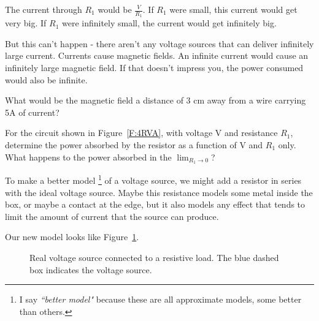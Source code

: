 The current through $R_1$ would be $\frac{V}{R_1}$. If $R_1$ were small, this current would get very big. If $R_1$ were infinitely small, the current would get infinitely big. \par
But this can't happen - there aren't any voltage sources that can deliver infinitely large current. Currents cause magnetic fields. An infinite current would cause an infinitely large magnetic field. If that doesn't impress you, the power consumed would also be infinite.

\begin{blevel}
What would be the magnetic field a distance of 3 cm away from a wire carrying 5A of current?
\end{blevel}

\begin{clevel}
For the circuit shown in Figure~\ref{F:4RVA}, with voltage V and resistance $R_1$, determine the power absorbed by the resistor as a function of V and $R_1$ only. What happens to the power absorbed in the $\lim_{R_1 \to 0}$? 
\end{clevel}

To make a better model \footnote{I say \emph{``better model"} because these are all approximate models, some better than others.} of a voltage source, we might add a resistor in series with the ideal voltage source. Maybe this resistance models some metal inside the box, or maybe a contact at the edge, but it also models any effect that tends to limit the amount of current that the source can produce.
\par
Our new model looks like Figure~\ref{F:4RVB}.

\begin{figure}[H]
\begin{center}
\caption{Real voltage source connected to a resistive load. The blue dashed box indicates the voltage source.}
\label{F:4RVB}
\end{center}
\end{figure}


